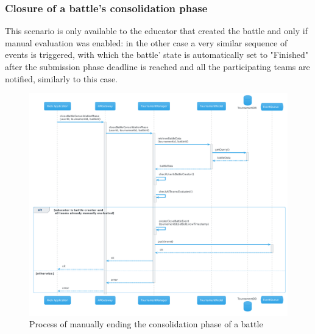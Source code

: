 \subsubsection{Closure of a battle's consolidation phase}
This scenario is only available to the educator that created the battle and only if manual evaluation was enabled: in the other case a very similar sequence of events is triggered, with which the battle' state is automatically set to "Finished" after the submission phase deadline is reached and all the participating teams are notified, similarly to this case.
\begin{figure}[H]
    \hspace{-1.7cm}
    \includegraphics[width=1.2\textwidth]{Diagrams/sequence/close_battle.png}
    \caption{Process of manually ending the consolidation phase of a battle}
\end{figure}
